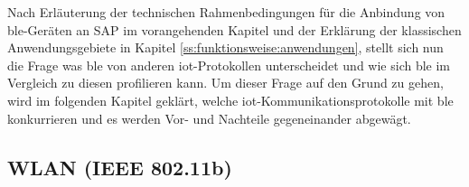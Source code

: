 \noindent Nach Erläuterung der technischen Rahmenbedingungen für die Anbindung von \ac{ble}-Geräten an SAP im vorangehenden Kapitel und der Erklärung der klassischen Anwendungsgebiete in Kapitel \ref{ss:funktionsweise:anwendungen}, stellt sich nun die Frage was \ac{ble} von anderen \ac{iot}-Protokollen unterscheidet und wie sich \ac{ble} im Vergleich zu diesen profilieren kann. Um dieser Frage auf den Grund zu gehen, wird im folgenden Kapitel geklärt, welche \ac{iot}-Kommunikationsprotokolle mit \ac{ble} konkurrieren und es werden Vor- und Nachteile gegeneinander abgewägt.\\ 

\subsection{WLAN (IEEE 802.11b)}
\label{ss:vergleich:wlan}

